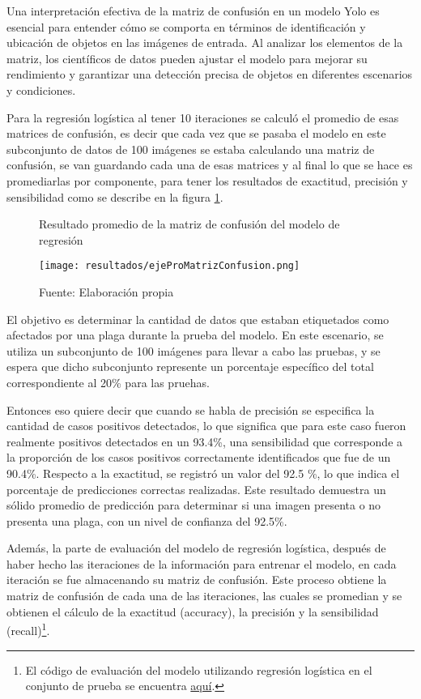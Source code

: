 Una interpretación efectiva de la matriz de confusión en un modelo Yolo es esencial para entender cómo se comporta en términos de identificación y ubicación de objetos en las imágenes de entrada. Al analizar los elementos de la matriz, los científicos de datos pueden ajustar el modelo para mejorar su rendimiento y garantizar una detección precisa de objetos en diferentes escenarios y condiciones.

Para la regresión logística al tener 10 iteraciones se calculó el promedio de esas matrices de confusión, es decir que cada vez que se pasaba el modelo en este subconjunto de datos de 100 imágenes se estaba calculando una matriz de confusión, se van guardando cada una de esas matrices y al final lo que se hace es promediarlas por componente, para tener los resultados de exactitud, precisión y sensibilidad como se describe en la figura \ref{fig:figuraEjeProMatrizConfusion}.

\begin{figure}[h]
\centering
\caption{Resultado promedio de la matriz de confusión del modelo de regresión}
\texttt{[image: resultados/ejeProMatrizConfusion.png]}
\caption*{\footnotesize Fuente: Elaboración propia}
\label{fig:figuraEjeProMatrizConfusion}
\end{figure}

\newpage

El objetivo es determinar la cantidad de datos que estaban etiquetados como afectados por una plaga durante la prueba del modelo. En este escenario, se utiliza un subconjunto de 100 imágenes para llevar a cabo las pruebas, y se espera que dicho subconjunto represente un porcentaje específico del total correspondiente al 20\% para las pruehas. \newline

Entonces eso quiere decir que cuando se habla de precisión se especifica la cantidad de casos positivos detectados, lo que significa que para este caso fueron realmente positivos detectados en un 93.4\%, una sensibilidad que corresponde a la proporción de los casos positivos correctamente identificados que fue de un 90.4\%. Respecto a la exactitud, se registró un valor del 92.5 \%, lo que indica el porcentaje de predicciones correctas realizadas. Este resultado demuestra un sólido promedio de predicción para determinar si una imagen presenta o no presenta una plaga, con un nivel de confianza del 92.5\%. \newline

Además, la parte de evaluación del modelo de regresión logística, después de haber hecho las iteraciones de la información para entrenar el modelo, en cada iteración se fue almacenando su matriz de confusión. Este proceso obtiene la matriz de confusión de cada una de las iteraciones, las cuales se promedian y se obtienen el cálculo de la exactitud (accuracy), la precisión y la sensibilidad (recall)\footnote{El código de evaluación del modelo utilizando regresión logística en el conjunto de prueba se encuentra \href{https://github.com/juferoto/mlops_project/blob/master/notebooks/modeloRegresion.ipynb}{aquí}.}. \newline

